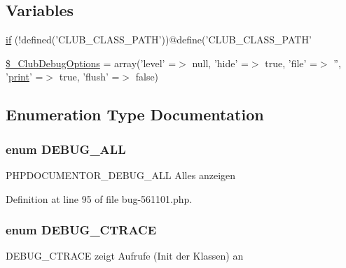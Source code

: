 \subsection*{\-Variables}
\begin{DoxyCompactItemize}
\item 
\hyperlink{bug-561101_8php_ac28699d88a08562a63d8b34e6f2eeb26}{if} (!defined('\-C\-L\-U\-B\-\_\-\-C\-L\-A\-S\-S\-\_\-\-P\-A\-T\-H'))@define('\-C\-L\-U\-B\-\_\-\-C\-L\-A\-S\-S\-\_\-\-P\-A\-T\-H'
\item 
\hyperlink{bug-561101_8php_af5d7017e9118ddafbf3e4cdefd32f92d}{\$\-\_\-\-Club\-Debug\-Options} = array('level' =$>$ null, 'hide' =$>$ true, 'file' =$>$ '', '\hyperlink{tokenizer__test_8php_a3ad3a4240c0f97c7e85aff5c52a454d4}{print}' =$>$ true, 'flush' =$>$ false)
\end{DoxyCompactItemize}


\subsection{\-Enumeration \-Type \-Documentation}
\hypertarget{bug-561101_8php_a8bd96e61bf1c12ff37c7f8b9f7cc19da}{
\subsubsection[{\-D\-E\-B\-U\-G\-\_\-\-A\-L\-L}]{\setlength{\rightskip}{0pt plus 5cm}enum {\bf \-D\-E\-B\-U\-G\-\_\-\-A\-L\-L}}}\label{bug-561101_8php_a8bd96e61bf1c12ff37c7f8b9f7cc19da}
\-P\-H\-P\-D\-O\-C\-U\-M\-E\-N\-T\-O\-R\-\_\-\-D\-E\-B\-U\-G\-\_\-\-A\-L\-L \-Alles anzeigen 

\-Definition at line 95 of file bug-\/561101.\-php.

\hypertarget{bug-561101_8php_a29701c9bd7e90c355cc107deffbbef18}{
\subsubsection[{\-D\-E\-B\-U\-G\-\_\-\-C\-T\-R\-A\-C\-E}]{\setlength{\rightskip}{0pt plus 5cm}enum {\bf \-D\-E\-B\-U\-G\-\_\-\-C\-T\-R\-A\-C\-E}}}\label{bug-561101_8php_a29701c9bd7e90c355cc107deffbbef18}
\-D\-E\-B\-U\-G\-\_\-\-C\-T\-R\-A\-C\-E zeigt \-Aufrufe (\-Init der \-Klassen) an 

